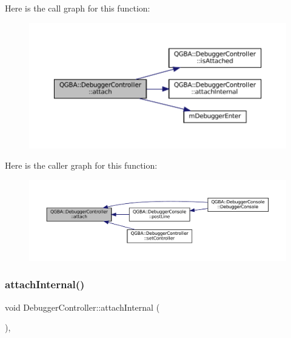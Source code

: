 Here is the call graph for this function\+:
\nopagebreak
\begin{figure}[H]
\begin{center}
\leavevmode
\includegraphics[width=350pt]{class_q_g_b_a_1_1_debugger_controller_a3096b2a62e42b414125a5f16c6cb49bc_cgraph}
\end{center}
\end{figure}
Here is the caller graph for this function\+:
\nopagebreak
\begin{figure}[H]
\begin{center}
\leavevmode
\includegraphics[width=350pt]{class_q_g_b_a_1_1_debugger_controller_a3096b2a62e42b414125a5f16c6cb49bc_icgraph}
\end{center}
\end{figure}
\mbox{\label{class_q_g_b_a_1_1_debugger_controller_a51748923ae90a2a2f1a5b9dc920f3a37}} 
\subsubsection{\texorpdfstring{attach\+Internal()}{attachInternal()}}
{\footnotesize\ttfamily void Debugger\+Controller\+::attach\+Internal (\begin{DoxyParamCaption}{ }\end{DoxyParamCaption})\hspace{0.3cm}{\ttfamily [protected]}, {\ttfamily [virtual]}}



